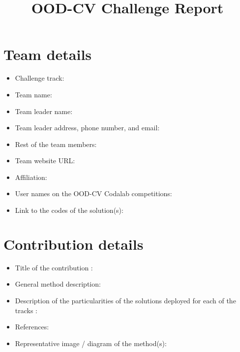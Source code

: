 \documentclass[12pt]{article}
\title{OOD-CV Challenge Report}
\begin{document}
\maketitle
\sloppy

\section{Team details}

\begin{itemize}
\item Challenge track: \\ 
\item Team name: \\
\item Team leader name: \\
\item Team leader address, phone number, and email: \\
\item Rest of the team members: \\
\item Team website URL: \\
\item Affiliation: \\
\item User names on the OOD-CV Codalab competitions: \\
\item Link to the codes of the solution(s): \\
\end{itemize}

\section{Contribution details}


\begin{itemize}
\item Title of the contribution : \\

\item General method description: \\


\item Description of the particularities of the solutions deployed for each of the tracks : \\



\item References: \\

\item Representative image / diagram of the method(s): \\             

\end{itemize}
\end{document}
